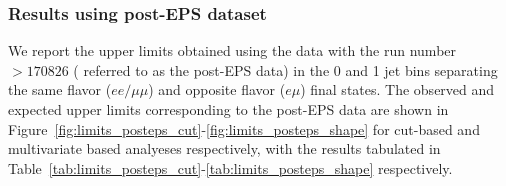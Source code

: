 

\subsubsection{Results using post-EPS dataset}

We report the upper limits obtained using the data with the run number $>170826$ ( referred to 
as the post-EPS data) in the 0 and 1 jet bins separating the 
same flavor ($ee/\mu\mu$) and opposite flavor ($e\mu$) final states.
The observed and expected upper limits corresponding to the post-EPS data are shown in 
Figure~\ref{fig:limits_posteps_cut}-\ref{fig:limits_posteps_shape} for cut-based and multivariate 
based analyeses respectively, with the results tabulated in 
Table~\ref{tab:limits_posteps_cut}-\ref{tab:limits_posteps_shape} respectively.

